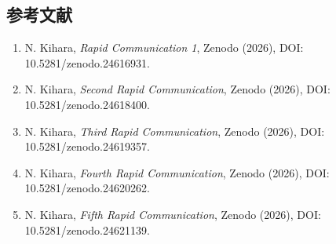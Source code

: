 \documentclass[
  a4paper,
]{ltjsarticle}
\providecommand{\tightlist}{%
  \setlength{\itemsep}{0pt}\setlength{\parskip}{0pt}}
\begin{document}
\subsection{参考文献}\label{ux53c2ux8003ux6587ux732e}

\begin{enumerate}
\def\labelenumi{\arabic{enumi}.}
\tightlist
\item
  N. Kihara, \emph{Rapid Communication 1}, Zenodo (2026), DOI:
  10.5281/zenodo.24616931.
\item
  N. Kihara, \emph{Second Rapid Communication}, Zenodo (2026), DOI:
  10.5281/zenodo.24618400.
\item
  N. Kihara, \emph{Third Rapid Communication}, Zenodo (2026), DOI:
  10.5281/zenodo.24619357.
\item
  N. Kihara, \emph{Fourth Rapid Communication}, Zenodo (2026), DOI:
  10.5281/zenodo.24620262.
\item
  N. Kihara, \emph{Fifth Rapid Communication}, Zenodo (2026), DOI:
  10.5281/zenodo.24621139.
\end{enumerate}
\end{document}
